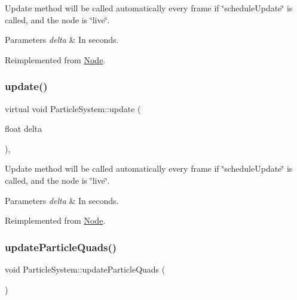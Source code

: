Update method will be called automatically every frame if \char`\"{}schedule\+Update\char`\"{} is called, and the node is \char`\"{}live\char`\"{}. 
\begin{DoxyParams}{Parameters}
{\em delta} & In seconds. \\
\hline
\end{DoxyParams}


Reimplemented from \hyperlink{classNode_a32878481ba54b3856ab53c10af13848e}{Node}.

\mbox{\label{classParticleSystem_ac2b03d34a27150678a2737453ad1b7e3}} 
\subsubsection{\texorpdfstring{update()}{update()}\hspace{0.1cm}{\footnotesize\ttfamily [2/2]}}
{\footnotesize\ttfamily virtual void Particle\+System\+::update (\begin{DoxyParamCaption}\item[{float}]{delta }\end{DoxyParamCaption})\hspace{0.3cm}{\ttfamily [override]}, {\ttfamily [virtual]}}

Update method will be called automatically every frame if \char`\"{}schedule\+Update\char`\"{} is called, and the node is \char`\"{}live\char`\"{}. 
\begin{DoxyParams}{Parameters}
{\em delta} & In seconds. \\
\hline
\end{DoxyParams}


Reimplemented from \hyperlink{classNode_a32878481ba54b3856ab53c10af13848e}{Node}.

\mbox{\label{classParticleSystem_a77929b8f9b3aca5d81362d3c3d80e378}} 
\subsubsection{\texorpdfstring{update\+Particle\+Quads()}{updateParticleQuads()}\hspace{0.1cm}{\footnotesize\ttfamily [1/2]}}
{\footnotesize\ttfamily void Particle\+System\+::update\+Particle\+Quads (\begin{DoxyParamCaption}{ }\end{DoxyParamCaption})\hspace{0.3cm}{\ttfamily [virtual]}}

